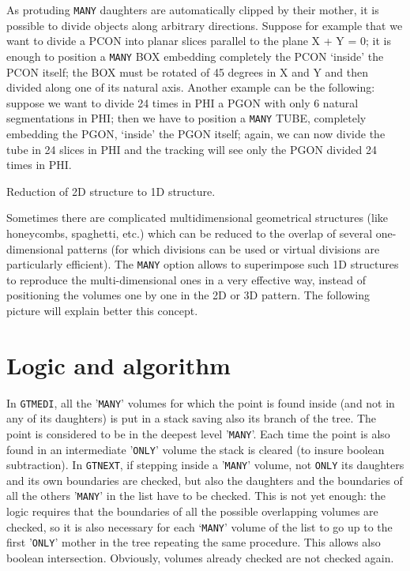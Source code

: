 As protuding {\tt MANY} daughters are automatically clipped by their mother, 
it is
possible to divide objects along arbitrary directions. Suppose for example
that we want to divide a PCON into planar slices parallel to the plane
X + Y = 0; it is enough to position a {\tt MANY} BOX embedding completely the
PCON `inside' the PCON itself; the BOX must be rotated of 45 degrees in X and
Y and then divided along one of its natural axis. Another example can be the
following: suppose we want to divide 24 times in PHI a PGON with only 6 natural
segmentations in PHI; 
then we have to position a {\tt MANY} TUBE, completely embedding
the PGON, `inside' the PGON itself; again, we can now divide the tube in 24
slices in PHI and the tracking will see only the PGON divided 24 times in PHI.
\begin{center}
Reduction of 2D structure to 1D structure.
\end{center}
Sometimes there are complicated multidimensional geometrical structures (like
honeycombs, spaghetti, etc.) which can be reduced to the overlap of several
one-dimensional patterns (for which divisions can be used or virtual divisions
are particularly efficient). The {\tt MANY} option allows to superimpose such 1D
structures to reproduce the multi-dimensional ones in a very effective way,
instead of positioning the volumes one by one in the 2D or 3D pattern.
The following picture will explain better this concept.


\section{Logic and algorithm}

In {\tt GTMEDI}, all the '{\tt MANY}' volumes for which the point 
is found inside (and not
in any of its daughters) is put in a stack saving also its branch of the tree.
The point is considered to be in the deepest level 
'{\tt MANY}'. Each time the point
is also found in an intermediate '{\tt ONLY}' volume the stack is 
cleared (to insure
boolean subtraction). In {\tt GTNEXT}, if stepping 
inside a '{\tt MANY}' volume, not {\tt ONLY}
its daughters and its own boundaries are checked, but also the daughters and
the boundaries of all the others '{\tt MANY}' in the 
list have to be checked. This
is not yet enough: the logic requires that the boundaries of all the possible
overlapping volumes are checked, so it is also necessary for each `{\tt MANY}' 
volume 
of the list to go up to the first '{\tt ONLY}' mother 
in the tree repeating the same 
procedure. This allows also boolean intersection. Obviously, volumes already
checked are not checked again. 


